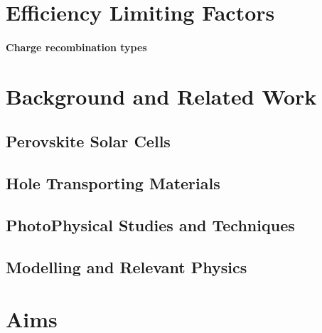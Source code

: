 \section{Efficiency Limiting Factors}

	\paragraph{Charge recombination types}

\section{Background and Related Work}\label{sec:background}

	\subsection{Perovskite Solar Cells}

	\subsection{Hole Transporting Materials}

	\subsection{PhotoPhysical Studies and Techniques}

	\subsection{Modelling and Relevant Physics}


\section{Aims}